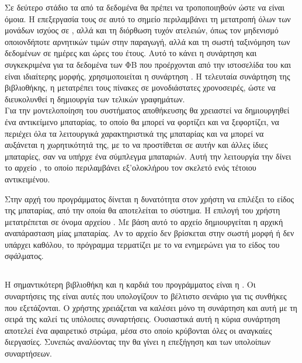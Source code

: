 \documentclass[12pt]{report}
\begin{document}
Σε δεύτερο στάδιο τα {} από τα δεδομένα θα πρέπει να τροποποιηθούν ώστε να είναι όμοια. Η επεξεργασία τους σε αυτό το σημείο περιλαμβάνει τη μετατροπή όλων των μονάδων ισχύος σε {}, αλλά και 
τη διόρθωση τυχόν ατελειών, όπως τον μηδενισμό οποιονδήποτε αρνητικών τιμών στην παραγωγή, αλλά και τη σωστή ταξινόμηση των δεδομένων σε ημέρες και ώρες του έτους. Αυτό το κάνει η συνάρτηση {\textbf{{}}} και 
συγκεκριμένα για τα δεδομένα των ΦΒ που προέρχονται από την ιστοσελίδα του {} και είναι ιδιαίτερης μορφής, χρησιμοποιείται η συνάρτηση {\textbf{{}}}. Η τελευταία συνάρτηση της βιβλιοθήκης, η 
{\textbf{{}}} μετατρέπει τους πίνακες σε μονοδιάστατες χρονοσειρές, ώστε να διευκολυνθεί η δημιουργία των τελικών γραφημάτων.
\\ [30pt]

Για την μοντελοποίηση του συστήματος αποθήκευσης θα χρειαστεί να δημιουργηθεί ένα αντικείμενο μπαταρίας, το οποίο θα μπορεί να φορτίζει και να ξεφορτίζει, να περιέχει όλα τα λειτουργικά χαρακτηριστικά της μπαταρίας και να μπορεί να 
αυξάνεται η χωρητικότητά της, με το να προστίθεται σε αυτήν και άλλες ίδιες μπαταρίες, σαν να υπήρχε ένα σύμπλεγμα μπαταριών. Αυτή την λειτουργία την δίνει το αρχείο {}, το οποίο περιλαμβάνει εξ'ολοκλήρου 
τον σκελετό ενός τέτοιου αντικειμένου. 

Στην αρχή του προγράμματος δίνεται η δυνατότητα στον χρήστη να επιλέξει το είδος της μπαταρίας, από την οποία θα αποτελείται το σύστημα. Η επιλογή του χρήστη μετατρέπεται σε όνομα αρχείου {}. Με βάση αυτό το αρχείο 
δημιουργείται η αρχική αναπάρασταση μίας μπαταρίας. Αν το αρχείο δεν βρίσκεται στην σωστή μορφή ή δεν υπάρχει καθόλου, το πρόγραμμα τερματίζει με το να ενημερώνει για το είδος του σφάλματος.

\subsection{{}}
Η σημαντικότερη βιβλιοθήκη και η καρδιά του προγράμματος είναι η {}. Οι συναρτήσεις της είναι αυτές που υπολογίζουν το βέλτιστο σενάριο για τις συνθήκες που εξετάζονται. Ο χρήστης χρειάζεται να καλέσει μόνο
τη συνάρτηση {\textbf{{}}} και αυτή με τη σειρά της καλεί τις υπόλοιπες συναρτήσεις. Ουσιαστικά αυτή η κύρια συνάρτηση αποτελεί ένα αφαιρετικό στρώμα, μέσα στο οποίο κρύβονται όλες οι αναγκαίες 
διεργασίες. Συνεπώς αναλύοντας την {\textbf{{}}} θα γίνει η επεξήγηση και των υπολοίπων συναρτήσεων.
\end{document}

